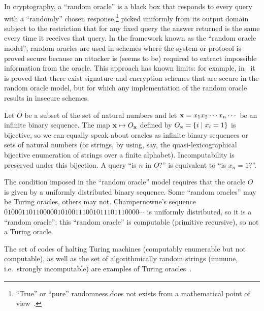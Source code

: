 \documentclass[preprint,11pt]{elsarticle}
\begin{document}
In cryptography, a ``random oracle'' is a black box that responds to every query with a ``randomly'' chosen response,\footnote{``True'' or ``pure'' randomness does not exists from a mathematical point of view~\cite{Calude:2002fk}.} picked uniformly from its output domain subject to the restriction that for any fixed query the answer returned is the same every time it receives that query.
In the framework known as the ``random oracle model'',  random oracles are  used in schemes where the system or  protocol is proved secure because an attacker is (seems to be) required to extract impossible information from the oracle. This approach has known limits: for example, in~\cite{Canetti:1998fk} it is proved that there exist signature and encryption schemes that are secure in the random oracle model, but for which any implementation of the random oracle results in insecure schemes.





Let $O$ be a subset of the set of natural numbers and let ${\bf x} = x_{1}x_{2}\cdots x_{n}\cdots$ be an infinite binary sequence. The map ${\bf x} \mapsto O_{\bf x}$ defined by
$ O_{\bf x} = \{i\mid x_{i}=1\}$  is bijective, so we can equally speak about oracles as infinite binary sequences or sets of natural numbers (or strings, by using, say, the quasi-lexicographical bijective enumeration of strings over a finite alphabet). Incomputability is preserved under this bijection. A query ``is $n$ in $O$?'' is equivalent to ``is $x_{n}=1$?''.

The condition imposed in the  ``random oracle'' model  requires that
the oracle $O$ is given by a  uniformly distributed binary sequence.
Some ``random oracles'' may be Turing oracles, others may not.
Champernowne's sequence $01000110110000010100111001011101110000\cdots$ is uniformly distributed, so it is  a ``random oracle''; this
``random oracle''  is computable (primitive recursive), so not a Turing oracle.

The set of codes of halting Turing machines
(computably enumerable  but not computable), as well as the set of algorithmically random strings (immune, i.e.\ strongly incomputable) are examples of Turing oracles~\cite{Calude:2002fk}.
\end{document}
